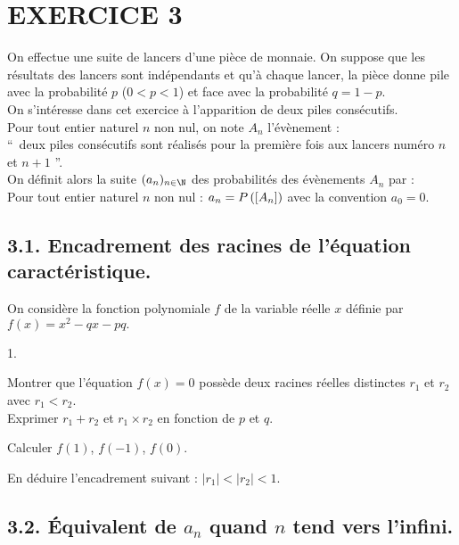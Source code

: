 \documentclass[11pt]{article}%
\begin{document}
\section*{EXERCICE 3}

On effectue une suite de lancers d'une pièce de monnaie. On suppose que
les résultats des lancers sont indépendants et qu'à chaque lancer, la
pièce donne pile avec la probabilité $p$ ($0<p<1$) et face avec la
probabilité $q = 1-p$.
\\
On s'intéresse dans cet exercice à l'apparition de deux piles
consécutifs.
\\
Pour tout entier naturel $n$ non nul, on note $A_{n}$ l'évènement :\\
\textquotedblleft\ deux piles consécutifs sont réalisés pour la
première
fois aux lancers numéro $n$ et $n + 1$ \textquotedblright.\\
On définit alors la suite $(a_{n})_{n\in \N}$ des probabilités des
évènements $A_{n}$ par :\\
Pour tout entier naturel $n$ non nul : $a_{n} =
P\left(\left[ {A_{n}} \right]\right)$ avec la convention $a_{0} = 0$.

\subsection*{3.1. Encadrement des racines de l'équation
caractéristique.}

On considère la fonction polynomiale $f$ de la variable réelle $x$
définie par $f(x) = x^{2}-qx-pq.$

\begin{noliste}{1.}
 \setlength{\itemsep}{4mm}
\item Montrer que l'équation $f(x) = 0$ possède deux racines réelles
distinctes $r_{1}$ et $r_{2}$ avec $r_{1}<r_{2}$.\\
Exprimer $r_{1} + r_{2}$ et $r_{1}\times r_{2}$ en fonction de $p$ et
$q$.

\item Calculer $f(1)$, $f(-1)$, $f(0)$.

\item En déduire l'encadrement suivant : $\left| r_{1}\right|
<\left| r_{2}\right| <1.$
\end{noliste}

\subsection*{3.2. Équivalent de $a_{n}$ quand $n$ tend vers l'infini.}
\end{document}
